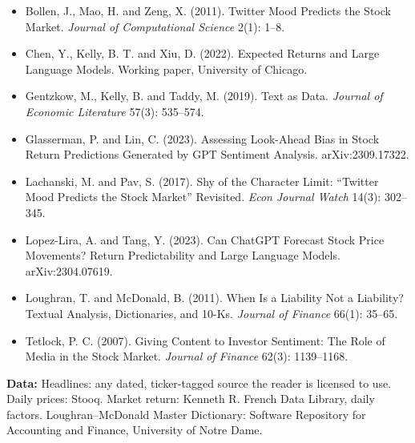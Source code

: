 \begin{itemize}
  \item Bollen, J., Mao, H. and Zeng, X. (2011). Twitter Mood Predicts the Stock Market. \emph{Journal of Computational Science} 2(1): 1--8.
  \item Chen, Y., Kelly, B. T. and Xiu, D. (2022). Expected Returns and Large Language Models. Working paper, University of Chicago.
  \item Gentzkow, M., Kelly, B. and Taddy, M. (2019). Text as Data. \emph{Journal of Economic Literature} 57(3): 535--574.
  \item Glasserman, P. and Lin, C. (2023). Assessing Look-Ahead Bias in Stock Return Predictions Generated by GPT Sentiment Analysis. arXiv:2309.17322.
  \item Lachanski, M. and Pav, S. (2017). Shy of the Character Limit: ``Twitter Mood Predicts the Stock Market'' Revisited. \emph{Econ Journal Watch} 14(3): 302--345.
  \item Lopez-Lira, A. and Tang, Y. (2023). Can ChatGPT Forecast Stock Price Movements? Return Predictability and Large Language Models. arXiv:2304.07619.
  \item Loughran, T. and McDonald, B. (2011). When Is a Liability Not a Liability? Textual Analysis, Dictionaries, and 10-Ks. \emph{Journal of Finance} 66(1): 35--65.
  \item Tetlock, P. C. (2007). Giving Content to Investor Sentiment: The Role of Media in the Stock Market. \emph{Journal of Finance} 62(3): 1139--1168.
\end{itemize}

\textbf{Data:} Headlines: any dated, ticker-tagged source the reader is licensed to use. Daily prices: Stooq. Market return: Kenneth R. French Data Library, daily factors. Loughran--McDonald Master Dictionary: Software Repository for Accounting and Finance, University of Notre Dame.
